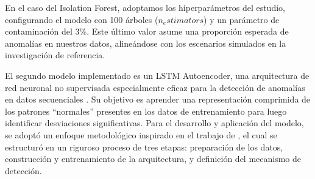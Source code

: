\begin{enumerate}
            En el caso del Isolation Forest, adoptamos los hiperparámetros del estudio, configurando el modelo con 100 árboles ($n_estimators$) y un parámetro de contaminación del 3\%. Este último valor asume una proporción esperada de anomalías en nuestros datos, alineándose con los escenarios simulados en la investigación de referencia.

            El segundo modelo implementado es un LSTM Autoencoder, una arquitectura de red neuronal no supervisada especialmente eficaz para la detección de anomalías en datos secuenciales \cite{malhotra2015long}. Su objetivo es aprender una representación comprimida de los patrones ``normales'' presentes en los datos de entrenamiento para luego identificar desviaciones significativas.
            Para el desarrollo y aplicación del modelo, se adoptó un enfoque metodológico inspirado en el trabajo de \citeauthor{reis2025edge} \citeyear{reis2025edge}, el cual se estructuró en un riguroso proceso de tres etapas: preparación de los datos, construcción y entrenamiento de la arquitectura, y definición del mecanismo de detección.


\end{enumerate}
